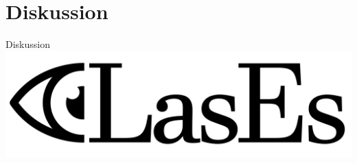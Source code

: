 \documentclass{beamer}
\begin{document}
    \section{Diskussion}
    \begin{frame}{Diskussion}
        \centering
        \includegraphics[width=0.7\linewidth]{../../docs/Pflichtenheft/graphics/LasEs-logo}
    \end{frame}
\end{document}
